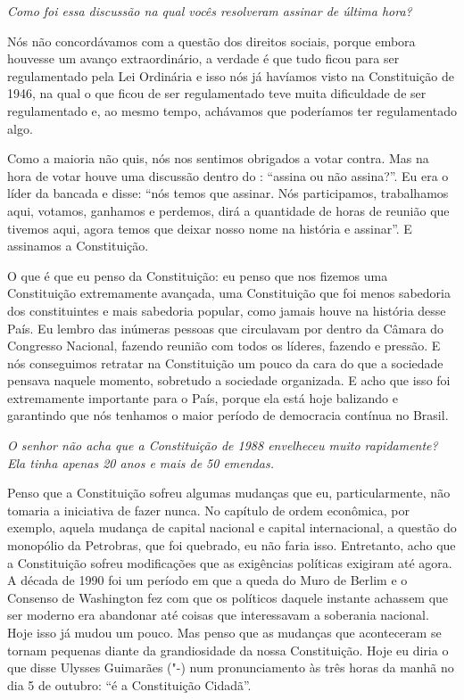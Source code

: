 \medskip

\noindent\emph{Como foi essa discussão na qual vocês resolveram assinar de
última hora? }

Nós não concordávamos com a questão dos direitos sociais,
porque embora houvesse um avanço extraordinário, a verdade é que tudo
ficou para ser regulamentado pela Lei Ordinária e isso nós já havíamos
visto na Constituição de 1946, na qual o que ficou de ser regulamentado
teve muita dificuldade de ser regulamentado e, ao mesmo tempo, achávamos
que poderíamos ter regulamentado algo.

Como a maioria não quis, nós nos sentimos obrigados a votar contra. Mas
na hora de votar houve uma discussão dentro do : ``assina ou não
assina?''. Eu era o líder da bancada e disse: ``nós temos que assinar.
Nós participamos, trabalhamos aqui, votamos, ganhamos e perdemos, dirá a
quantidade de horas de reunião que tivemos aqui, agora temos que deixar
nosso nome na história e assinar''. E assinamos a Constituição.

O que é que eu penso da Constituição: eu penso que nos fizemos uma
Constituição extremamente avançada, uma Constituição que foi menos
sabedoria dos constituintes e mais sabedoria popular, como jamais houve
na história desse País. Eu lembro das inúmeras pessoas que circulavam
por dentro da Câmara do Congresso Nacional, fazendo reunião com todos os
líderes, fazendo e pressão. E nós conseguimos retratar na Constituição
um pouco da cara do que a sociedade pensava naquele momento, sobretudo a
sociedade organizada. E acho que isso foi extremamente importante para o
País, porque ela está hoje balizando e garantindo que nós tenhamos o
maior período de democracia contínua no Brasil.

\medskip

\noindent\emph{O senhor não acha que a Constituição de 1988 envelheceu muito
rapidamente? Ela tinha apenas 20 anos e mais de 50 emendas.}

Penso que a Constituição sofreu algumas mudanças que eu,
particularmente, não tomaria a iniciativa de fazer nunca. No capítulo de
ordem econômica, por exemplo, aquela mudança de capital nacional e
capital internacional, a questão do monopólio da Petrobras, que foi
quebrado, eu não faria isso. Entretanto, acho que a Constituição sofreu
modificações que as exigências políticas exigiram até agora. A década de
1990 foi um período em que a queda do Muro de Berlim e o Consenso de
Washington fez com que os políticos daquele instante achassem que ser
moderno era abandonar até coisas que interessavam a soberania nacional.
Hoje isso já mudou um pouco. Mas penso que as mudanças que aconteceram
se tornam pequenas diante da grandiosidade da nossa Constituição. Hoje
eu diria o que disse Ulysses Guimarães ("-) num pronunciamento às
três horas da manhã no dia 5 de outubro: ``é a Constituição Cidadã''.

